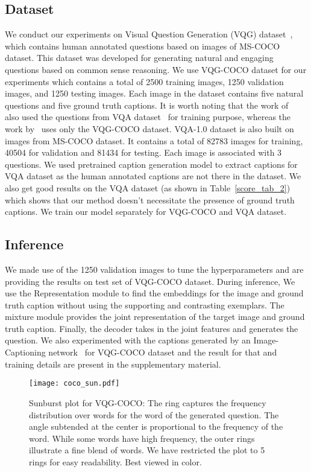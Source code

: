 \documentclass[11pt,a4paper]{article}
\begin{document}
\subsection{Dataset}
We conduct our experiments on  Visual Question Generation (VQG) dataset~\cite{mostafazadeh2016generating}, which contains human annotated questions based on images of MS-COCO dataset. This dataset was developed for generating natural and engaging questions based on common sense reasoning. We use VQG-COCO dataset for our experiments which contains a total of 2500 training images, 1250 validation images, and 1250 testing images. Each image in the dataset contains five natural questions and five ground truth captions. It is worth noting that the work of~\cite{jain2017creativity} also used the questions from VQA dataset~\cite{VQA} for training purpose, whereas the work by~\cite{mostafazadeh2016generating} uses only the VQG-COCO dataset.
VQA-1.0 dataset is also built on images from MS-COCO dataset. It contains a total of 82783 images for training, 40504 for validation and 81434 for testing. Each image is associated with 3 questions. We used pretrained caption generation model \cite{Karpathy_CVPR2015} to extract captions for VQA dataset as the human annotated captions are not there in the dataset. We also get good results on the VQA dataset (as shown in Table~\ref{score_tab_2}) which shows that our method doesn't necessitate the presence of ground truth captions. We train our model separately for VQG-COCO and VQA dataset.


\subsection{Inference}
We made use of the 1250 validation images to tune the hyperparameters and are providing the results on test set of VQG-COCO dataset. 
During inference, We use the Representation module to find the embeddings for the image and ground truth caption without using the supporting and contrasting exemplars. The mixture module provides the joint representation of the target image and ground truth caption. Finally, the decoder takes in the joint features and generates the question. We also experimented with the captions generated by an Image-Captioning network~\cite{Karpathy_CVPR2015} for VQG-COCO dataset and the result for that and training details are present in the supplementary material.


\begin{figure}[ht]
	\centering
	\texttt{[image: coco\_sun.pdf]}
\caption{Sunburst plot for VQG-COCO: The  ring captures the frequency distribution over words for the  word of the generated question. The angle subtended at the center is proportional to the frequency of the word. While some words have high frequency, the outer rings illustrate a fine blend of words. We have restricted the plot to 5 rings for easy readability. Best viewed in color.}
	\label{tbl:sunburst}
\end{figure}
\end{document}
